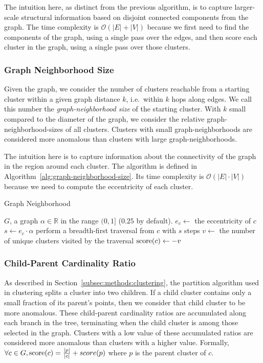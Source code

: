 The intuition here, as distinct from the previous algorithm, is to capture larger-scale structural information based on disjoint connected components from the graph.
The time complexity is $\mathcal{O}(|E| + |V|)$ because we first need to find the components of the graph, using a single pass over the edges, and then score each cluster in the graph, using a single pass over those clusters.

\subsubsection{Graph Neighborhood Size}
\label{subsubsec:methods:individual-algorithms:graph-neighborhood-size}
Given the graph, we consider the number of clusters reachable from a starting cluster within a given graph distance $k$, i.e.\ within $k$ hops along edges.
We call this number the \textit{graph-neighborhood size} of the starting cluster.
With $k$ small compared to the diameter of the graph, we consider the relative graph-neighborhood-sizes of all clusters.
Clusters with small graph-neighborhoods are considered more anomalous than clusters with large graph-neighborhoods.

The intuition here is to capture information about the connectivity of the graph in the region around each cluster.
The algorithm is defined in Algorithm~\ref{alg:graph-neighborhood-size}.
Its time complexity is $\mathcal{O}(|E| \cdot |V|)$ because we need to compute the eccentricity of each cluster.

\begin{algorithm}[h]
    \caption{Graph Neighborhood}
    \label{alg:graph-neighborhood-size}
\begin{algorithmic}[1]
    \REQUIRE $G$, a graph
    \REQUIRE $\alpha \in \mathbb{R}$ in the range $(0,1]$ ($0.25$ by default).
        \STATE $e_c \gets$ the eccentricity of $c$
        \STATE $s \gets e_c \cdot \alpha$
        \STATE perform a breadth-first traversal from $c$ with $s$ steps
        \STATE $v \gets$ the number of unique clusters visited by the traversal
        \STATE $\operatorname{score}(c) \gets -v$
    \ENDFOR
\end{algorithmic}
\end{algorithm}


\subsubsection{Child-Parent Cardinality Ratio}
\label{subsubsec:methods:individual-algorithms:child-parent-cardinality-ratio}
As described in Section~\ref{subsec:methods:clustering}, the partition algorithm used in clustering splits a cluster into two children.
If a child cluster contains only a small fraction of its parent's points, then we consider that child cluster to be more anomalous.
These child-parent cardinality ratios are accumulated along each branch in the tree, terminating when the child cluster is among those selected in the graph.
Clusters with a low value of these accumulated ratios are considered more anomalous than clusters with a higher value.
Formally, $\forall c \in G, \operatorname{score}(c) = \frac{|p|}{|c|} + score(p)$ where $p$ is the parent cluster of $c$.

